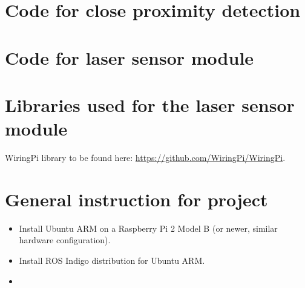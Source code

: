 \section{Code for close proximity detection}\label{code:proximity-full}


\clearpage

\section{Code for laser sensor module}\label{code:laser-full}


\clearpage

\section{Libraries used for the laser sensor module}\label{code:laser-libs}

\clearpage


WiringPi library to be found here: \url{https://github.com/WiringPi/WiringPi}.

\clearpage

\section{General instruction for project}
\begin{itemize}
	\item Install Ubuntu ARM on a Raspberry Pi 2 Model B (or newer, similar hardware configuration).
	\item Install ROS Indigo distribution for Ubuntu ARM.
	\item 
\end{itemize}


